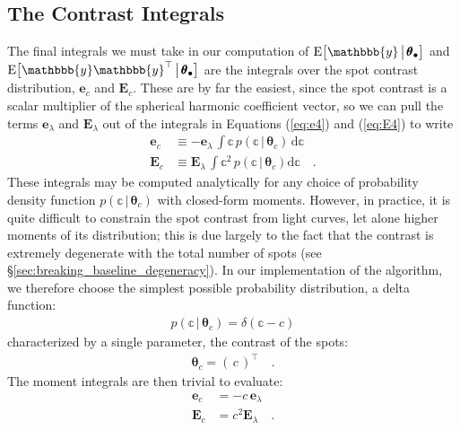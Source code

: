 \documentclass[modern]{aastex62}
\begin{document}
\subsection{The Contrast Integrals}
\label{sec:contrast}
%
The final integrals we must take in our computation of
$\mathrm{E} \big[ \mathbbb{y} \, \big| \, \pmb{\theta}_\bullet \big]$
and $\mathrm{E} \big[ \mathbbb{y} \mathbbb{y}^\top \, \big| \, \pmb{\theta}_\bullet \big]$
are the integrals over
the spot contrast distribution, $\mathbf{e}_c$ and $\mathbf{E}_c$.
These are by far the easiest, since the spot contrast is a scalar
multiplier of the spherical harmonic coefficient vector, so we can
pull the terms $\mathbf{e}_\lambda$ and $\mathbf{E}_\lambda$ out
of the
integrals in Equations (\ref{eq:e4}) and (\ref{eq:E4}) to write
%
\begin{align}
    \mathbf{e}_c
     & \equiv
    -
    \mathbf{e}_\lambda \,
    \int
    \mathbb{c} \,
    p(\mathbb{c} \, \big| \, \pmb{\theta}_{c}) \,
    \mathrm{d}\mathbb{c}
    \\
    \mathbf{E}_c
     & \equiv
    \mathbf{E}_\lambda \,
    \int
    \mathbb{c}^2 \,
    p(\mathbb{c} \, \big| \, \pmb{\theta}_c)
    \mathrm{d}\mathbb{c}
    \quad.
\end{align}
%
These integrals may be computed analytically for any choice of
probability density function $p(\mathbb{c} \, \big| \, \pmb{\theta}_c)$
with closed-form moments.
%
However, in practice, it is quite difficult to constrain the
spot contrast from light curves, let alone higher moments of its
distribution; this is due largely to the fact that the contrast
is extremely degenerate with the total number of spots
(see \S\ref{sec:breaking_baseline_degeneracy}).
%
In our implementation of the algorithm,
we therefore choose the simplest possible probability distribution,
a delta function:
%
\begin{align}
    p(\mathbb{c} \, \big| \, \pmb{\theta}_{c}) = \delta(\mathbb{c} - c)
\end{align}
%
characterized by a single parameter, the contrast of the spots:
%
\begin{align}
    \pmb{\theta}_c = \left( \, c \, \right)^\top
    \quad.
\end{align}
%
The moment integrals are then trivial to evaluate:
%
\begin{align}
    \label{eq:ec}
    \mathbf{e}_c & = - c \, \mathbf{e}_\lambda
    \\
    \label{eq:bigEc}
    \mathbf{E}_c & = c^2 \mathbf{E}_\lambda
    \quad.
\end{align}
%
\end{document}

